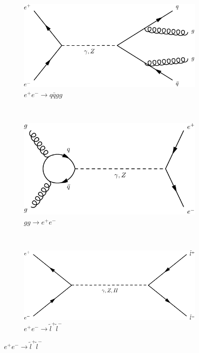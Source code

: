 \begin{figure}[h]
  \centering
  \begin{subfigure}[b]{0.3\textwidth}
    \includegraphics[width=\textwidth]{../dia/01.pdf}
    \caption{$e^+e^- \rightarrow q\bar{q}gg$}
    \label{fey:1}
  \end{subfigure}%
  ~
  \begin{subfigure}[b]{0.3\textwidth}
    \includegraphics[width=\textwidth]{../dia/02.pdf}
    \caption{$gg\rightarrow e^+e^-$}
    \label{fey:2}
  \end{subfigure}%
  ~
  \begin{subfigure}[b]{0.3\textwidth}
    \includegraphics[width=\textwidth]{../dia/03.pdf}
    \caption{$e^+e^-\rightarrow \tilde{l}^+\tilde{l}^-$}

\end{subfigure}
\end{figure}
